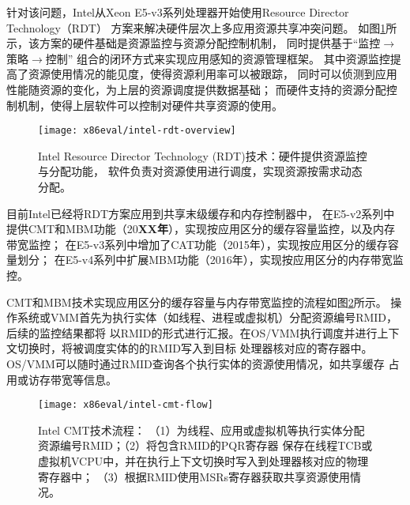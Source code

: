 针对该问题，Intel从Xeon E5-v3系列处理器开始使用Resource Director Technology（RDT）
方案来解决硬件层次上多应用资源共享冲突问题。
如图\ref{fig:intel-rdt-overview}所示，该方案的硬件基础是资源监控与资源分配控制机制，
同时提供基于``监控$\rightarrow$策略$\rightarrow$控制''
组合的闭环方式来实现应用感知的资源管理框架。
其中资源监控提高了资源使用情况的能见度，使得资源利用率可以被跟踪，
同时可以侦测到应用性能随资源的变化，为上层的资源调度提供数据基础；
而硬件支持的资源分配控制机制，使得上层软件可以控制对硬件共享资源的使用。

\begin{figure}[H]
  \centering
  \texttt{[image: x86eval/intel-rdt-overview]}
  \caption[Intel Resource Director Technology (RDT) 技术示意图]{
    Intel Resource Director Technology (RDT)技术：硬件提供资源监控与分配功能，
    软件负责对资源使用进行调度，实现资源按需求动态分配。}
  \label{fig:intel-rdt-overview}
\end{figure}

目前Intel已经将RDT方案应用到共享末级缓存和内存控制器中，
在E5-v2系列中提供CMT和MBM功能（20\textbf{XX年}），实现按应用区分的缓存容量监控，以及内存带宽监控；
在E5-v3系列中增加了CAT功能（2015年），实现按应用区分的缓存容量划分；
在E5-v4系列中扩展MBM功能（2016年），实现按应用区分的内存带宽监控。

CMT和MBM技术实现应用区分的缓存容量与内存带宽监控的流程如图\ref{fig:intel-cmt-flow}所示。
操作系统或VMM首先为执行实体（如线程、进程或虚拟机）分配资源编号RMID，后续的监控结果都将
以RMID的形式进行汇报。在OS/VMM执行调度并进行上下文切换时，将被调度实体的的RMID写入到目标
处理器核对应的寄存器中。OS/VMM可以随时通过RMID查询各个执行实体的资源使用情况，如共享缓存
占用或访存带宽等信息。
 
\begin{figure}[H]
  \centering
  \texttt{[image: x86eval/intel-cmt-flow]}
  \caption[Intel Cache Monitor Technology (CMT) 技术流程]{Intel CMT技术流程：
   （1）为线程、应用或虚拟机等执行实体分配资源编号RMID；（2）将包含RMID的PQR寄存器
   保存在线程TCB或虚拟机VCPU中，并在执行上下文切换时写入到处理器核对应的物理寄存器中；
   （3）根据RMID使用MSRs寄存器获取共享资源使用情况。}
  \label{fig:intel-cmt-flow}
\end{figure}

